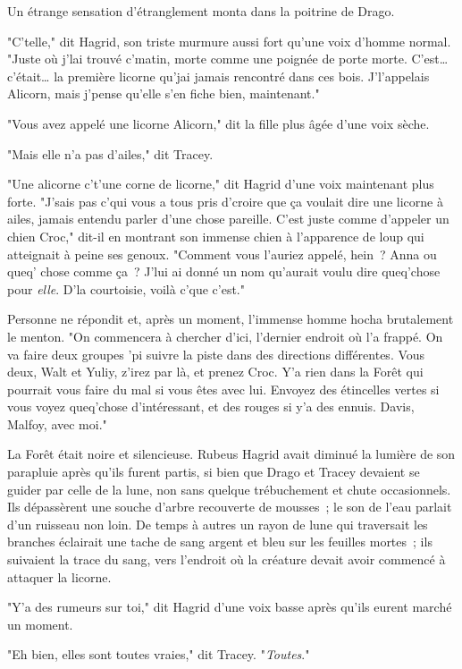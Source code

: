 Un étrange sensation d'étranglement monta dans la poitrine de Drago.

"C'telle," dit Hagrid, son triste murmure aussi fort qu'une voix d'homme normal. "Juste où j'lai trouvé c'matin, morte comme une poignée de porte morte. C'est… c'était… la première licorne qu'jai jamais rencontré dans ces bois. J'l'appelais Alicorn, mais j'pense qu'elle s'en fiche bien, maintenant."

"Vous avez appelé une licorne Alicorn," dit la fille plus âgée d'une voix sèche.

"Mais elle n'a pas d'ailes," dit Tracey.

"Une alicorne c't'une corne de licorne," dit Hagrid d'une voix maintenant plus forte. "J'sais pas c'qui vous a tous pris d'croire que ça voulait dire une licorne à ailes, jamais entendu parler d'une chose pareille. C'est juste comme d'appeler un chien Croc," dit-il en montrant son immense chien à l'apparence de loup qui atteignait à peine ses genoux. "Comment vous l'auriez appelé, hein~? Anna ou queq' chose comme ça~? J'lui ai donné un nom qu'aurait voulu dire queq'chose pour \emph{elle}. D'la courtoisie, voilà c'que c'est."

Personne ne répondit et, après un moment, l'immense homme hocha brutalement le menton. "On commencera à chercher d'ici, l'dernier endroit où l'a frappé. On va faire deux groupes 'pi suivre la piste dans des directions différentes. Vous deux, Walt et Yuliy, z'irez par là, et prenez Croc. Y'a rien dans la Forêt qui pourrait vous faire du mal si vous êtes avec lui. Envoyez des étincelles vertes si vous voyez queq'chose d'intéressant, et des rouges si y'a des ennuis. Davis, Malfoy, avec moi."

La Forêt était noire et silencieuse. Rubeus Hagrid avait diminué la lumière de son parapluie après qu'ils furent partis, si bien que Drago et Tracey devaient se guider par celle de la lune, non sans quelque trébuchement et chute occasionnels. Ils dépassèrent une souche d'arbre recouverte de mousses~; le son de l'eau parlait d'un ruisseau non loin. De temps à autres un rayon de lune qui traversait les branches éclairait une tache de sang argent et bleu sur les feuilles mortes~; ils suivaient la trace du sang, vers l'endroit où la créature devait avoir commencé à attaquer la licorne.

"Y'a des rumeurs sur toi," dit Hagrid d'une voix basse après qu'ils eurent marché un moment.

"Eh bien, elles sont toutes vraies," dit Tracey. "\emph{Toutes}."

